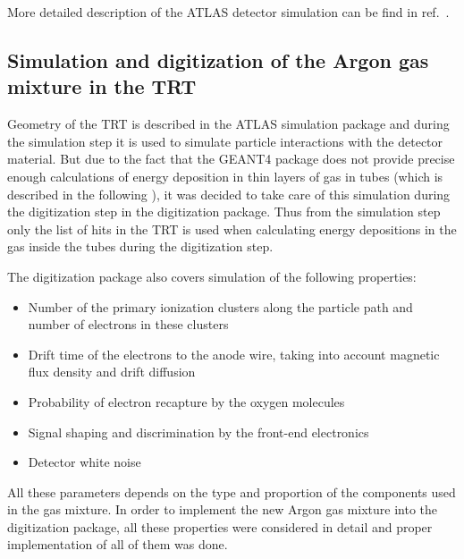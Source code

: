 More detailed description of the ATLAS detector simulation can be find in ref.~\cite{Aad:2010ah}.

\subsection{Simulation and digitization of the Argon gas mixture in the TRT}
\label{subsec:TRT:argonImpl}


Geometry of the TRT is described in the ATLAS simulation package and during the simulation step it is used to simulate particle interactions with the detector material.
But due to the fact that the GEANT4 package does not provide precise enough calculations of energy deposition in thin layers of gas in tubes 
(which is described in the following ), it was decided to take care of this simulation during the digitization step in the digitization package.
Thus from the simulation step only the list of hits in the TRT is used when calculating energy depositions in the gas inside the tubes during the digitization step.

The digitization package also covers simulation of the following properties:
\begin{itemize}
 \item Number of the primary ionization clusters along the particle path and number of electrons in these clusters
 \item Drift time of the electrons to the anode wire, taking into account magnetic flux density and drift diffusion
 \item Probability of electron recapture by the oxygen molecules
 \item Signal shaping and discrimination by the front-end electronics
 \item Detector white noise
\end{itemize}

All these parameters depends on the type and proportion of the components used in the gas mixture. 
In order to implement the new Argon gas mixture into the digitization package, all these properties were considered in detail 
and proper implementation of all of them was done.


